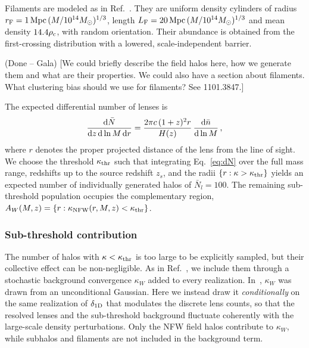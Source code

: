 \documentclass[aps,prd,10pt,nofootinbib,twocolumn,superscriptaddress,floatfix,notitlepage]{revtex4-1}
\newcommand{\Msun}{M_\odot}
\newcommand{\td}{{\rm d}}
\newcommand{\be}{\begin{equation}}
\newcommand{\ee}{\end{equation}}
\newcommand{\Gala}[1]{{\color{orange} (#1 -- Gala)}}
\newcommand{\R}[1]{{\color{red} #1}}
\begin{document}
Filaments are modeled as in Ref.~\cite{Vaskonen:2026ubd}. They are uniform density
cylinders of radius $r_{\rm F} = 1\,{\rm Mpc}\,(M/10^{14}\Msun)^{1/3}$, length
$L_{\rm F} = 20\,{\rm Mpc}\,(M/10^{14}\Msun)^{1/3}$ and mean density
$14.4\rho_{\rm c}$, with random orientation. Their abundance is obtained from
the first-crossing distribution with a lowered, scale-independent barrier. 

\Gala{Done}
\R{[We could briefly describe the field halos here, how we generate them and what are their properties. We could also have a section about filaments. What clustering bias should we use for filaments? See 1101.3847.]}

The expected differential number of lenses is
\be \label{eq:dN}
    \frac{\td \bar N}{\td z \, \td \ln M \, \td r} =
    \frac{2\pi c \, (1+z)^2 r}{H(z)} \, \frac{\td \bar{n}}{\td \ln M} \,,
\ee
where $r$ denotes the proper projected distance of the lens from the line of sight. We choose the threshold $\kappa_{\rm thr}$ such that integrating Eq.~\eqref{eq:dN} over the full mass range, redshifts up to the source redshift $z_s$, and the radii $\{r:\kappa>\kappa_{\rm thr}\}$ yields an expected number of individually generated halos of $\bar N_l = 100$. The remaining sub-threshold population occupies the complementary region, $A_W(M,z) = \{ r :  \kappa_{\rm NFW}(r,M,z) < \kappa_{\rm thr} \}$.


\subsubsection{Sub-threshold contribution}

The number of halos with $\kappa < \kappa_{\rm thr}$ is too large to be explicitly sampled, but their collective effect can be non-negligible. As in Ref.~\cite{Vaskonen:2026ubd}, we include them through a stochastic background convergence $\kappa_W$ added to every realization. In~\cite{Vaskonen:2026ubd}, $\kappa_W$ was drawn from an unconditional Gaussian. Here we instead draw it \emph{conditionally} on the same realization of $\delta_{\rm 1D}$ that modulates the discrete lens counts, so that the resolved lenses and the sub-threshold background fluctuate coherently with the large-scale density perturbations. Only the NFW field halos contribute to $\kappa_W$,  while subhalos and filaments are not included in the background term.
\end{document}
